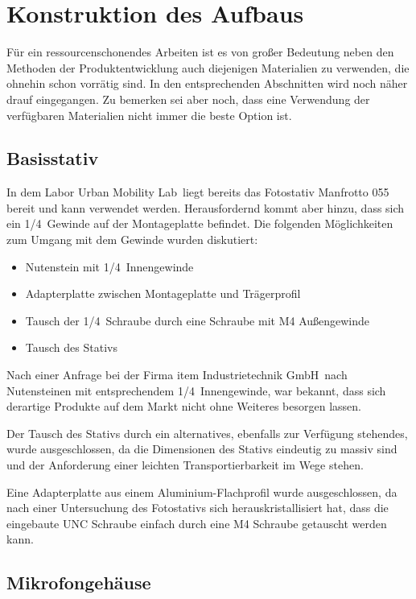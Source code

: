 \section{Konstruktion des Aufbaus}

Für ein ressourcenschonendes Arbeiten ist es von großer Bedeutung neben den Methoden der Produktentwicklung auch diejenigen Materialien zu verwenden, die ohnehin schon vorrätig sind. In den entsprechenden Abschnitten wird noch näher drauf eingegangen. Zu bemerken sei aber noch, dass eine Verwendung der verfügbaren Materialien nicht immer die beste Option ist.

\subsection{Basisstativ}

In dem Labor \glqq Urban Mobility Lab\grqq\ liegt bereits das Fotostativ Manfrotto 055 bereit und kann verwendet werden. Herausfordernd kommt aber hinzu, dass sich ein 1/4\grqq\ Gewinde auf der Montageplatte befindet. Die folgenden Möglichkeiten zum Umgang mit dem Gewinde wurden diskutiert:

\begin{itemize}
	\item Nutenstein mit 1/4\grqq\ Innengewinde
	\item Adapterplatte zwischen Montageplatte und Trägerprofil
	\item Tausch der 1/4\grqq\ Schraube durch eine Schraube mit M4 Außengewinde
	\item Tausch des Stativs
\end{itemize}

Nach einer Anfrage bei der Firma \glqq item Industrietechnik GmbH\grqq\ nach Nutensteinen mit entsprechendem 1/4\grqq\ Innengewinde, war bekannt, dass sich derartige Produkte auf dem Markt nicht ohne Weiteres besorgen lassen.

Der Tausch des Stativs durch ein alternatives, ebenfalls zur Verfügung stehendes, wurde ausgeschlossen, da die Dimensionen des Stativs eindeutig zu massiv sind und der Anforderung einer leichten Transportierbarkeit im Wege stehen.

Eine Adapterplatte aus einem Aluminium-Flachprofil wurde ausgeschlossen, da nach einer Untersuchung des Fotostativs sich herauskristallisiert hat, dass die eingebaute UNC Schraube einfach durch eine M4 Schraube getauscht werden kann.

\subsection{Mikrofongehäuse}

